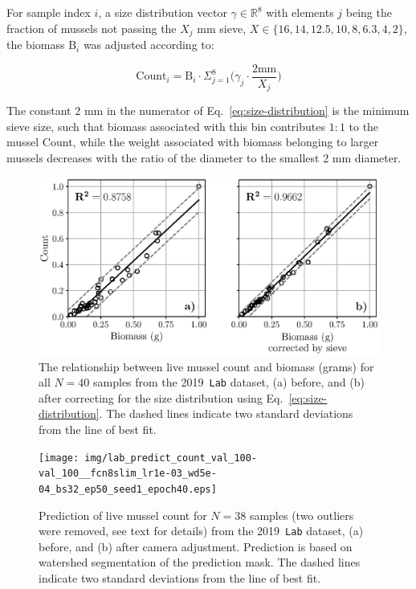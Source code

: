 \documentclass[11pt]{article} %
\begin{document}
For sample index $i$, a size distribution vector $\gamma \in \mathbb{R}^8$ with 
elements $j$ being the fraction of mussels not passing the $X_j$ mm sieve, 
$X \in \{16, 14, 12.5, 10, 8, 6.3, 4, 2\}$, the biomass $\text{B}_i$ was 
adjusted according to:

\begin{equation} \label{eq:size-distribution}
\text{Count}_i = \text{B}_i \cdot \Sigma_{j=1}^8 \bigg( \gamma_j \cdot \frac{2 
\text{mm}}{X_j} \bigg)
\end{equation}

The constant 2 mm in the numerator of Eq.~\eqref{eq:size-distribution} is the 
minimum sieve size, such that biomass associated with this bin contributes 
$1:1$ to the mussel Count, while the weight associated with biomass belonging 
to larger mussels decreases with the ratio of the diameter to the smallest 2 mm
diameter.

\begin{figure}
\centering
\includegraphics[width=0.9\linewidth]{img/lab_count_from_biomass.eps}
\caption{The relationship between live mussel count and biomass (grams)
for all $N=40$ samples from the 2019~\texttt{Lab} dataset, (a) before, and (b) 
after correcting for the size distribution using
Eq.~\eqref{eq:size-distribution}. The dashed lines indicate two standard
deviations from the line of best fit.}
\label{fig:count-from-biomass}
\end{figure}

\begin{figure}
\centering
\texttt{[image: img/lab\_predict\_count\_val\_100-val\_100\_\_fcn8slim\_lr1e-03\_wd5e-04\_bs32\_ep50\_seed1\_epoch40.eps]}
\caption{Prediction of live mussel count for $N=38$ samples (two outliers were
removed, see text for details) from the 2019~\texttt{Lab} dataset, (a) before, 
and (b) after camera adjustment. Prediction is based on watershed segmentation 
of the prediction mask. The dashed lines indicate two standard deviations from
the line of best fit.}
\label{fig:count-from-watershed}
\end{figure}
\end{document}
